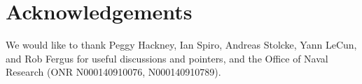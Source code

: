 \documentclass[times, 10pt,twocolumn]{article}
\begin{document}
\section{Acknowledgements}
We would like to thank Peggy Hackney, Ian Spiro, Andreas Stolcke, Yann LeCun, and Rob Fergus for useful discussions and pointers, and the Office of Naval Research (ONR N000140910076, N000140910789).



{\tiny


}
\end{document}
